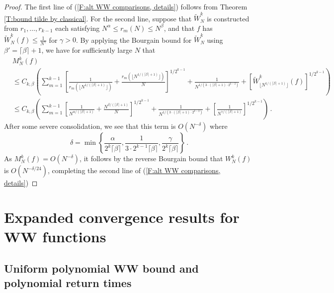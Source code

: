 \documentclass[11pt, oneside]{amsart}   	%
\newcommand{\1}{\mathbbm{1}}
\newcommand{\floor}[1]{\lfloor#1\rfloor}
\theoremstyle{definition}
\begin{document}
\begin{proof}
The first line of (\ref{F:alt WW comparisons, details}) follows from Theorem \ref{T:bound tilde by classical}. For the second line, suppose that $\widetilde W_N^k$ is constructed from $r_1, \dots, r_{k-1}$ each satisfying $N^\alpha \leq r_m(N) \leq N^\beta$, and that $f$ has $\widetilde W_N^k(f) \leq \frac{1}{N^\gamma}$ for $\gamma>0$. By applying the Bourgain bound for $\widetilde W_N^k$ using $\beta' = \lceil \beta\rceil + 1$, we have for sufficiently large $N$ that
\begin{align*}
&M_N^k(f) \\
&\leq C_{k, \beta}\left(\sum_{m=1}^{k-1}\left[\frac{1}{r_m(\floor{N^{1/(\lceil\beta\rceil + 1)}})} + \frac{r_m(\floor{N^{1/(\lceil\beta\rceil + 1)}})}{N} \right]^{1/2^{k-1}} + \frac{1}{N^{1/(3\cdot (\lceil\beta\rceil + 1) \cdot 2^{k-2})}}+ \left[\widetilde W_{\floor{N^{1/(\lceil\beta\rceil + 1)}}}^k(f)\right]^{1/2^{k-1}} \right) \\
&\leq C_{k, \beta}\left(\sum_{m=1}^{k-1}\left[\frac{1}{N^{\alpha/(\lceil\beta\rceil + 1)}} + \frac{N^{\beta / (\lceil\beta \rceil+1)}}{N} \right]^{1/2^{k-1}} + \frac{1}{N^{1/(3\cdot (\lceil\beta\rceil + 1) \cdot 2^{k-2})}}+ \left[\frac{1}{N^{\gamma/(\lceil\beta\rceil + 1)}}\right]^{1/2^{k-1}} \right)\, .
\end{align*}
After some severe consolidation, we see that this term is $O(N^{-\delta})$ where
$$\delta = \min\left\{ \frac{\alpha}{2^{k} \lceil\beta\rceil}, \frac{1}{3 \cdot 2^{k-1} \lceil\beta\rceil}, \frac{\gamma}{2^k \lceil\beta\rceil} \right\} \, .$$
As $M_N^k(f) = O(N^{-\delta})$, it follows by the reverse Bourgain bound that $W_N^{k}(f)$ is $O(N^{-\delta /24})$, completing the second line of (\ref{F:alt WW comparisons, details})
\end{proof}





\section{Expanded convergence results for WW functions}\label{S:Conv results}



\subsection{Uniform polynomial WW bound and polynomial return times}\label{S:Polynomial bounds}
\end{document}
